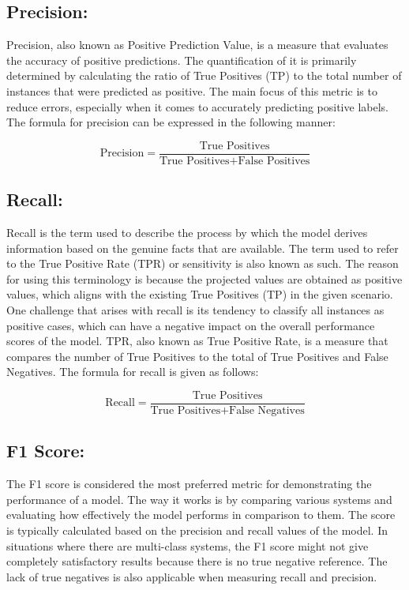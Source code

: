 \subsection{Precision:}



Precision, also known as Positive Prediction Value, is a measure that evaluates the accuracy of positive predictions. The quantification of it is primarily determined by calculating the ratio of True Positives (TP) to the total number of instances that were predicted as positive. The main focus of this metric is to reduce errors, especially when it comes to accurately predicting positive labels\cite{javaid2016deep}\cite{yacouby-axman-2020-probabilistic}. The formula for precision can be expressed in the following manner:

\[
\text{Precision} = \frac{\text{True Positives}}{\text{True Positives} + \text{False Positives}}
\]





\subsection{Recall:}



Recall is the term used to describe the process by which the model derives information based on the genuine facts that are available. The term used to refer to the True Positive Rate (TPR) or sensitivity is also known as such. The reason for using this terminology is because the projected values are obtained as positive values, which aligns with the existing True Positives (TP) in the given scenario. One challenge that arises with recall is its tendency to classify all instances as positive cases, which can have a negative impact on the overall performance scores of the model. TPR, also known as True Positive Rate, is a measure that compares the number of True Positives to the total of True Positives and False Negatives\cite{javaid2016deep}\cite{yacouby-axman-2020-probabilistic}. The formula for recall is given as follows:

$$\text{Recall} = \frac{\text{True Positives}}{\text{True Positives} + \text{False Negatives}}$$


\subsection{F1 Score:}


The F1 score is considered the most preferred metric for demonstrating the performance of a model. The way it works is by comparing various systems and evaluating how effectively the model performs in comparison to them. The score is typically calculated based on the precision and recall values of the model. In situations where there are multi-class systems, the F1 score might not give completely satisfactory results because there is no true negative reference. The lack of true negatives is also applicable when measuring recall and precision\cite{yacouby-axman-2020-probabilistic}.

